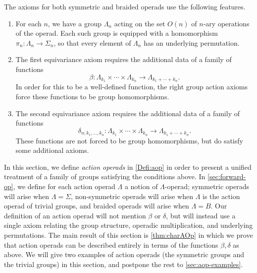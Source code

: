 The axioms for both symmetric and braided operads use the following features.
\begin{enumerate}
\item For each $n$, we have a group $\Lambda_n$ acting on the set $O(n)$ of $n$-ary operations of the operad. Each such group is equipped with a homomorphism $\pi_n \colon \Lambda_n \to \Sigma_n$, so that every element of $\Lambda_n$ has an underlying permutation.
\item The first equivariance axiom requires the additional data of a family of functions
\[
\beta \colon \Lambda_{k_1} \times \cdots \times \Lambda_{k_n} \to \Lambda_{k_1 + \cdots + k_n}.
\]
In order for this to be a well-defined function, the right group action axioms force these functions to be group homomorphisms.
\item The second equivariance axiom requires the additional data of a family of functions
\[
\delta_{n; k_1, \ldots, k_n} \colon \Lambda_{k_1} \times \cdots \times \Lambda_{k_n} \to \Lambda_{k_1 + \cdots + k_n}.
\]
These functions are not forced to be group homomorphisms, but do satisfy some additional axioms.
\end{enumerate}
In this section, we define \emph{action operads} in \cref{Defi:aop} in order to present a unified treatment of a family of groups satisfying the conditions above. 
In \cref{sec:forward-op}, we define for each action operad $\Lambda$ a notion of $\Lambda$-operad; symmetric operads will arise when $\Lambda = \Sigma$, non-symmetric operads will arise when $\Lambda$ is the action operad of trivial groups, and braided operads will arise when $\Lambda = B$.
Our definition of an action operad will not mention $\beta$ or $\delta$, but will instead use a single axiom relating the group structure, operadic multiplication, and underlying permutations. 
The main result of this section is \cref{thm:charAOp} in which we prove that action operads can be described entirely in terms of the functions $\beta, \delta$ as above.
We will give two examples of action operads (the symmetric groups and the trivial groups) in this section, and postpone the rest to \cref{sec:aop-examples}.


